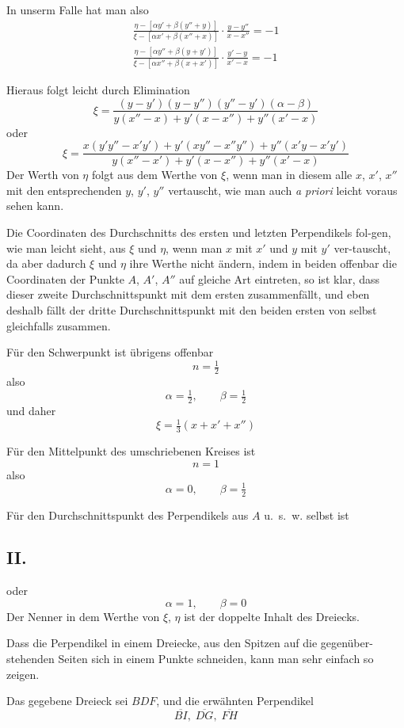 \documentclass[12pt,a4paper]{article}
\begin{document}
In unserm Falle hat man also
\begin{gather*}
\frac{\eta - [\alpha y' + \beta(y''+y)]}{\xi - [\alpha x' + \beta(x''+x)]} \cdot \frac{y-y''}{x-x''} = -1 \\
\frac{\eta - [\alpha y'' + \beta(y+y')]}{\xi - [\alpha x'' + \beta(x+x')]} \cdot \frac{y'-y}{x'-x} = -1
\end{gather*}

Hieraus folgt leicht durch Elimination
\[
\xi = \frac{(y-y')(y-y'')(y''-y')(\alpha-\beta)}{y(x''-x) + y'(x-x'') + y''(x'-x)}
\]
oder
\[
\xi = \frac{x(y'y''-x'y') + y'(xy''-x''y'') + y''(x'y-x'y')}{y(x''-x') + y'(x-x'') + y''(x'-x)}
\]
Der Werth von $\eta$ folgt aus dem Werthe von $\xi$, wenn man in diesem alle
$x$, $x'$, $x''$ mit den entsprechenden $y$, $y'$, $y''$ vertauscht, wie man auch \textit{a priori}
leicht voraus sehen kann.

Die Coordinaten des Durchschnitts des ersten und letzten Perpendikels fol-\/gen, wie man leicht sieht, aus $\xi$ und $\eta$, wenn man $x$ mit $x'$ und $y$ mit $y'$ ver-\/tauscht, da aber dadurch $\xi$ und $\eta$ ihre Werthe nicht \"andern, indem in beiden
offenbar die Coordinaten der Punkte $A$, $A'$, $A''$ auf gleiche Art eintreten, so ist
klar, dass dieser zweite Durchschnittspunkt mit dem ersten zusammenf\"allt, und
eben deshalb f\"allt der dritte Durchschnittspunkt mit den beiden ersten von selbst
gleichfalls zusammen.

F\"ur den Schwerpunkt ist \"ubrigens offenbar
\[
n = \tfrac{1}{2}
\]
also
\[
\alpha = \tfrac{1}{2},\qquad \beta = \tfrac{1}{2}
\]
und daher
\[
\xi = \tfrac{1}{3}(x+x'+x'')
\]

F\"ur den Mittelpunkt des umschriebenen Kreises ist
\[
n = 1
\]
also
\[
\alpha = 0,\qquad \beta = \tfrac{1}{2}
\]

F\"ur den Durchschnittspunkt des Perpendikels aus $A$ u.~s.~w. selbst ist

\newpage
\subsection*{II.}

oder
\[
\alpha = 1,\qquad \beta = 0
\]
Der Nenner in dem Werthe von $\xi$, $\eta$ ist der doppelte Inhalt des Dreiecks.

Dass die Perpendikel in einem Dreiecke, aus den Spitzen auf die gegen\"uber-\/stehenden Seiten sich in einem Punkte schneiden, kann man sehr einfach so zeigen.

Das gegebene Dreieck sei $BDF$, und die erw\"ahnten Perpendikel
\[
\overline{BI},\; \overline{DG},\; \overline{FH}
\]
\end{document}
